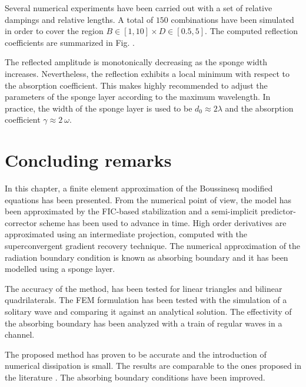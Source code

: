 Several numerical experiments have been carried out with a set of relative dampings and relative lengths. A total of $150$ combinations have been simulated in order to cover the region $B\in[1, 10] \times D\in[0.5, 5]$. The computed reflection coefficients are summarized in Fig. .

The reflected amplitude is monotonically decreasing as the sponge width increases. Nevertheless, the reflection exhibits a local minimum with respect to the absorption coefficient. This makes highly recommended to adjust the parameters of the sponge layer according to the  maximum wavelength.
In practice, the width of the sponge layer is used to be $d_0 \approx 2\lambda$ and the absorption coefficient $\gamma \approx 2\ \omega$.



\section{Concluding remarks}


In this chapter, a finite element approximation of the Boussinesq modified equations has been presented. From the numerical point of view, the model has been approximated by the FIC-based stabilization and a semi-implicit predictor-corrector scheme has been used to advance in time. High order derivatives are approximated using an intermediate projection, computed with the superconvergent gradient recovery technique.
The numerical approximation of the radiation boundary condition is known as absorbing boundary and it has been modelled using a sponge layer.

The accuracy of the method, has been tested for linear triangles and bilinear quadrilaterals. The FEM formulation has been tested with the simulation of a solitary wave and comparing it against an analytical solution. The effectivity of the absorbing boundary has been analyzed with a train of regular waves in a channel.

The proposed method has proven to be accurate and the introduction of numerical dissipation is small. The results are comparable to the ones proposed in the literature \cite{nwogu1993,wei1995,walkley2002,codina2008b}. The absorbing boundary conditions have been improved.

